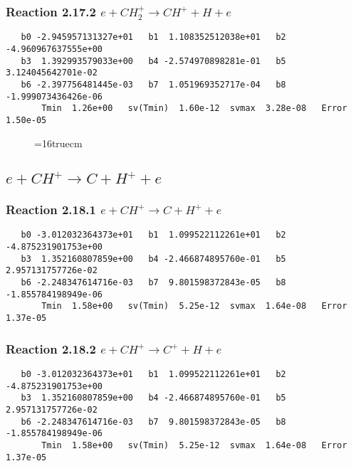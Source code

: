 \documentclass[12pt]{article}
\begin{document}
\subsubsection{
Reaction 2.17.2   $e + CH_2^+ \rightarrow CH^+ + H + e$
}

\begin{small}\begin{verbatim} 
   b0 -2.945957131327e+01   b1  1.108352512038e+01   b2 -4.960967637555e+00
   b3  1.392993579033e+00   b4 -2.574970898281e-01   b5  3.124045642701e-02
   b6 -2.397756481445e-03   b7  1.051969352717e-04   b8 -1.999073436426e-06
       Tmin  1.26e+00   sv(Tmin)  1.60e-12  svmax  3.28e-08   Error  1.50e-05
\end{verbatim}\end{small}

\begin{figure} \label{met.2_2.17}
\epsfxsize=16truecm
\end{figure}
\newpage
 
\subsection{ 
$e + CH^+ \rightarrow C + H^+ + e$
}
 
\subsubsection{
Reaction 2.18.1   $e + CH^+ \rightarrow C + H^+ + e$
}

\begin{small}\begin{verbatim} 
   b0 -3.012032364373e+01   b1  1.099522112261e+01   b2 -4.875231901753e+00
   b3  1.352160807859e+00   b4 -2.466874895760e-01   b5  2.957131757726e-02
   b6 -2.248347614716e-03   b7  9.801598372843e-05   b8 -1.855784198949e-06
       Tmin  1.58e+00   sv(Tmin)  5.25e-12  svmax  1.64e-08   Error  1.37e-05
\end{verbatim}\end{small}

\subsubsection{
Reaction 2.18.2   $e + CH^+ \rightarrow C^+ + H + e$
}

\begin{small}\begin{verbatim} 
   b0 -3.012032364373e+01   b1  1.099522112261e+01   b2 -4.875231901753e+00
   b3  1.352160807859e+00   b4 -2.466874895760e-01   b5  2.957131757726e-02
   b6 -2.248347614716e-03   b7  9.801598372843e-05   b8 -1.855784198949e-06
       Tmin  1.58e+00   sv(Tmin)  5.25e-12  svmax  1.64e-08   Error  1.37e-05
\end{verbatim}\end{small}
\end{document}
